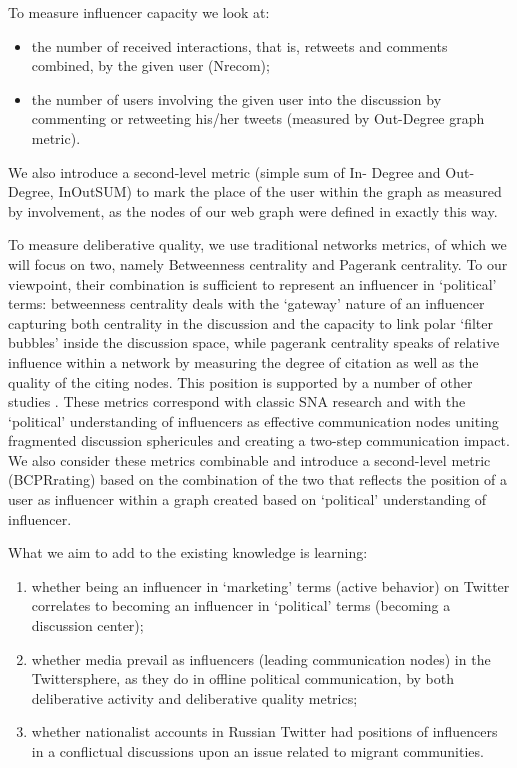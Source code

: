 To measure influencer capacity we look at:
\begin{itemize}
	\item the number of received interactions, that is, retweets and comments combined, by the given user (Nrecom);
	\item the number of users involving the given user into the discussion by commenting or retweeting his/her tweets (measured by Out-Degree graph metric).
\end{itemize}

We also introduce a second-level metric (simple sum of In- Degree and Out-Degree, InOutSUM) to mark the place of the user within the graph as measured by involvement, as the nodes of our web graph were defined in exactly this way.

To measure deliberative quality, we use traditional networks metrics, of which we will focus on two, namely Betweenness centrality and Pagerank centrality. To our viewpoint, their combination is sufficient to represent an influencer in ‘political’ terms: betweenness centrality deals with the ‘gateway’ nature of an influencer capturing both centrality in the discussion and the capacity to link polar ‘filter bubbles’ \cite{Pariser} inside the discussion space, while pagerank centrality speaks of relative influence within a network by measuring the degree of citation as well as the quality of the citing nodes. This position is supported by a number of other studies \cite{GruzdRoy,XuSangBlasiola}. These metrics correspond with classic SNA research and with the ‘political’ understanding of influencers as effective communication nodes uniting fragmented discussion sphericules \cite{Gitlin} and creating a two-step communication impact. We also consider these metrics combinable and introduce a second-level metric (BCPRrating) based on the combination of the two that reflects the position of a user as influencer within a graph created based on ‘political’ understanding of influencer.

What we aim to add to the existing knowledge is learning:
\begin{enumerate}
	\item whether being an influencer in ‘marketing’ terms (active behavior) on Twitter correlates to becoming an influencer in ‘political’ terms (becoming a discussion center);
	\item whether media prevail as influencers (leading communication nodes) in the Twittersphere, as they do in offline political communication, by both deliberative activity and deliberative quality metrics;
	\item whether nationalist accounts in Russian Twitter had positions of influencers in a conflictual discussions upon an issue related to migrant communities.
\end{enumerate}

